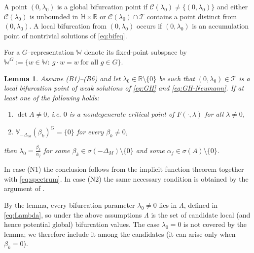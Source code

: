 \documentclass[reqno,twoside,12pt]{amsart}
\newtheorem{Lemma}[Remark]{Lemma}
\newcommand{\bH}{\mathbb{H}}
\newcommand{\bR}{\mathbb{R}}
\newcommand{\bV}{\mathbb{V}}
\newcommand{\bW}{\mathbb{W}}
\newcommand{\cC}{\mathcal{C}}
\newcommand{\cT}{\mathcal{T}}
\numberwithin{equation}{section} \errorcontextlines=0
\begin{document}
A point $(0,\lambda_{0})$ is a global bifurcation point if $\cC(\lambda_{0})\neq\{(0,\lambda_{0})\}$ and either $\cC(\lambda_{0})$ is unbounded in $\bH\times\bR$ or $\cC(\lambda_{0})\cap\cT$ contains a point distinct from $(0,\lambda_{0})$.
A local bifurcation from $(0,\lambda_{0})$ occurs if $(0,\lambda_{0})$ is an accumulation point of nontrivial solutions of \eqref{eq:bifeq}.

For a $G$–representation $\bW$ denote its fixed-point subspace by $\bW^{G}:=\{w\in\bW:\ g\cdot w=w\ \text{for all }g\in G\}$.

\begin{Lemma}\label{lem:nec}
Assume \textnormal{(B1)}--\textnormal{(B6)} and let $\lambda_{0}\in\bR\setminus\{0\}$ be such that $(0,\lambda_0)\in\mathcal T$ is a local bifurcation point of weak solutions of \eqref{eq:GH} and \eqref{eq:GH-Neumann}. If at least one of the following holds:
\begin{enumerate}
\item[(N1)] $\det A\neq 0$, i.e. $0$ is a nondegenerate critical point of $F(\cdot,\lambda)$ for all $\lambda\neq 0$,
\item[(N2)] $\bV_{-\Delta_M}(\beta_k)^{G}=\{0\}$ for every $\beta_k\neq 0$,
\end{enumerate}
then $\displaystyle \lambda_{0}=\frac{\beta_{k}}{\alpha_{j}}$ for some $\beta_{k}\in\sigma(-\Delta_{M})\setminus\{0\}$ and some $\alpha_{j}\in\sigma(A)\setminus\{0\}$.
\end{Lemma}

In case \textnormal{(N1)} the conclusion follows from the implicit function theorem together with \eqref{eq:spectrum}. In case \textnormal{(N2)} the same necessary condition is obtained by the argument of \cite[Lemma~3.5]{GolKluSte2}.

By the lemma, every bifurcation parameter $\lambda_{0}\neq 0$ lies in $\Lambda$, defined in \eqref{eq:Lambda}, so under the above assumptions $\Lambda$ is the set of candidate local (and hence potential global) bifurcation values. The case $\lambda_0=0$ is not covered by the lemma; we therefore include it among the candidates (it can arise only when $\beta_k=0$).
\end{document}

